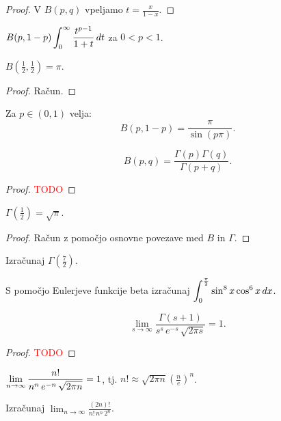 \begin{proof}
    V \(B(p,q)\) vpeljamo \(t = \frac{x}{1-x}\).
\end{proof}

\begin{posledica}
    \(\displaystyle B(p, 1-p) \int_{0}^{\infty} \frac{t^{p-1}}{1+t} \, dt\) za \(0<p<1\).
\end{posledica}

\begin{posledica}
    \(B(\frac{1}{2}, \frac{1}{2}) = \pi\).
\end{posledica}

\begin{proof}
    Račun.
\end{proof}

\begin{opomba}
    Za \(p \in (0,1)\) velja: \[B(p, 1-p) = \frac{\pi}{\sin (p \pi)}.\]
\end{opomba}

\begin{izrek}
    \[B(p,q) = \frac{\Gamma(p) \Gamma(q)}{\Gamma(p+q)}.\]
\end{izrek}

\begin{proof}
    \textcolor{red}{TODO}
\end{proof}

\begin{posledica}
    \(\Gamma(\frac{1}{2}) = \sqrt{\pi}\).
\end{posledica}

\begin{proof}
    Račun z pomočjo osnovne povezave med \(B\) in \(\Gamma\).
\end{proof}

\begin{primer}
    Izračunaj \(\Gamma(\frac{7}{2})\).
\end{primer}

\begin{primer}
    S pomočjo Eulerjeve funkcije beta izračunaj \(\displaystyle \int_{0}^{\frac{\pi}{2}} \sin^8x \cos^6x \, dx\).
\end{primer}

\newpage
\begin{izrek}
    \[\lim_{s \to \infty} \frac{\Gamma(s+1)}{s^s \, e^{-s} \, \sqrt{2 \pi s}} = 1.\]
\end{izrek}

\begin{proof}
    \textcolor{red}{TODO}
\end{proof}

\begin{posledica}
    \(\displaystyle \lim_{n \to \infty} \frac{n!}{n^n \, e ^{-n} \, \sqrt{2 \pi n}} = 1\), tj. \(n! \approx \sqrt{2 \pi n} (\frac{n}{e})^n\).
\end{posledica}

\begin{primer}
    Izračunaj \( \lim_{n \to \infty} \frac{(2n)!}{n! \, n^n \, 2^n}\).
\end{primer}
